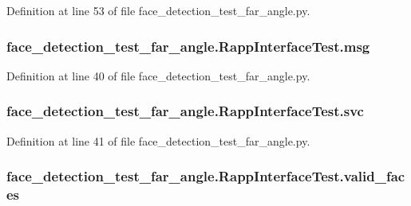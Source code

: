 Definition at line 53 of file face\-\_\-detection\-\_\-test\-\_\-far\-\_\-angle.\-py.

\hypertarget{classface__detection__test__far__angle_1_1RappInterfaceTest_a3884e78c483fc3ff16ca82b0ecdaafb8}{
\subsubsection[{msg}]{\setlength{\rightskip}{0pt plus 5cm}face\-\_\-detection\-\_\-test\-\_\-far\-\_\-angle.\-Rapp\-Interface\-Test.\-msg}}\label{classface__detection__test__far__angle_1_1RappInterfaceTest_a3884e78c483fc3ff16ca82b0ecdaafb8}


Definition at line 40 of file face\-\_\-detection\-\_\-test\-\_\-far\-\_\-angle.\-py.

\hypertarget{classface__detection__test__far__angle_1_1RappInterfaceTest_ad94e3540bed07c1f2525b1f58f969e1b}{
\subsubsection[{svc}]{\setlength{\rightskip}{0pt plus 5cm}face\-\_\-detection\-\_\-test\-\_\-far\-\_\-angle.\-Rapp\-Interface\-Test.\-svc}}\label{classface__detection__test__far__angle_1_1RappInterfaceTest_ad94e3540bed07c1f2525b1f58f969e1b}


Definition at line 41 of file face\-\_\-detection\-\_\-test\-\_\-far\-\_\-angle.\-py.

\hypertarget{classface__detection__test__far__angle_1_1RappInterfaceTest_a43da4f563cf8cc2c46264ef57e466ce3}{
\subsubsection[{valid\-\_\-faces}]{\setlength{\rightskip}{0pt plus 5cm}face\-\_\-detection\-\_\-test\-\_\-far\-\_\-angle.\-Rapp\-Interface\-Test.\-valid\-\_\-faces}}\label{classface__detection__test__far__angle_1_1RappInterfaceTest_a43da4f563cf8cc2c46264ef57e466ce3}


